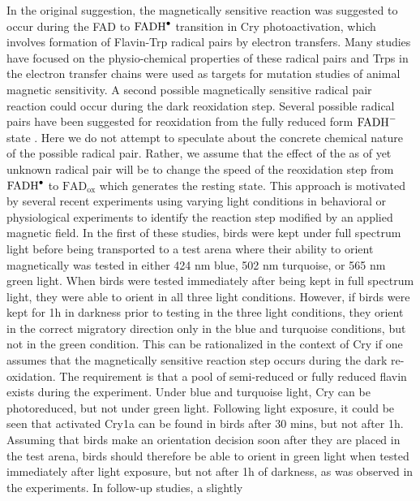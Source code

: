 \documentclass[twoside,twocolumn,9pt]{article}
\begin{document}
In the original suggestion, \cite{Ritz2000} the magnetically sensitive reaction was suggested to occur during the FAD to
$\ce{FADH^{.}}$ transition in Cry photoactivation, which involves formation of Flavin-Trp radical pairs by electron transfers. Many
studies have focused on the physio-chemical properties of these radical pairs \cite{Atkins2019, Solovyov2007, Biskup2009,
	Sheppard2017} and Trps in the electron transfer chains were used as targets for mutation studies of animal magnetic sensitivity.
\cite{Gegear2010, Fedele2014} A second possible magnetically sensitive radical pair reaction could occur during the dark reoxidation
step. Several possible radical pairs have been suggested for reoxidation from the fully reduced form $\ce{FADH^{-}}$ state
\cite{Ritz2009, FADH-Z RP}. Here we do not attempt to speculate about the concrete chemical nature of the possible radical pair.
Rather, we assume that the effect of the as of yet unknown radical pair will be to change the speed of the reoxidation step from
$\ce{FADH^{.}}$ to $\text{FAD}_{\text{ox}}$ which generates the resting state. This approach is motivated by several recent
experiments using varying light conditions in behavioral or physiological experiments to identify the reaction step modified by an
applied magnetic field. In the first of these studies, birds were kept under full spectrum light before being transported to a test
arena where their ability to orient magnetically was tested in either 424 nm blue, 502 nm turquoise, or 565 nm green light.
\cite{Wiltschko2014} When birds were tested immediately after being kept in full spectrum light, they were able to orient in all
three light conditions. However, if birds were kept for 1h in darkness prior to testing in the three light conditions, they orient
in the correct migratory direction only in the blue and turquoise conditions, but not in the green condition. This can be
rationalized in the context of Cry if one assumes that the magnetically sensitive reaction step occurs during the dark re-oxidation.
The requirement is that a pool of semi-reduced or fully reduced flavin exists during the experiment. Under blue and turquoise light,
Cry can be photoreduced, but not under green light. Following light exposure, it could be seen that activated Cry1a can be found in
birds after 30 mins, but not after 1h. \cite{Niessner2013, Niessner2014} Assuming that birds make an orientation decision soon after
they are placed in the test arena, birds should therefore be able to orient in green light when tested immediately after light
exposure, but not after 1h of darkness, as was observed in the experiments. \cite{Wiltschko2014} In follow-up studies, a slightly
\end{document}

